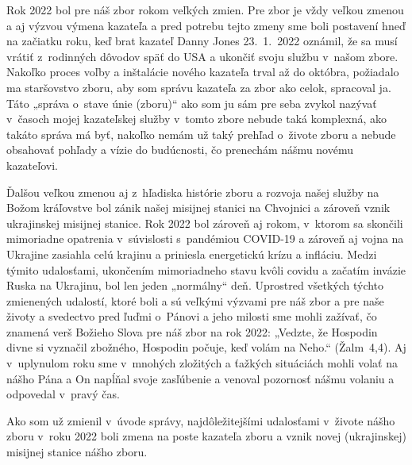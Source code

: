 \def\velkostpisma{9}
\def\velkostriadku{12}



Rok 2022 bol pre náš zbor rokom veľkých zmien. Pre zbor je vždy veľkou zmenou a aj výzvou výmena kazateľa a pred potrebu tejto zmeny sme boli postavení hneď na začiatku roku, keď brat kazateľ Danny Jones 23.~1.~2022 oznámil, že sa musí vrátiť z~rodinných dôvodov späť do USA a ukončiť svoju službu v~našom zbore. Nakoľko proces voľby a inštalácie nového kazateľa trval až do októbra, požiadalo ma staršovstvo zboru, aby som správu kazateľa za zbor ako celok, spracoval ja. Táto „správa o~stave únie (zboru)“ ako som ju sám pre seba zvykol nazývať v~časoch mojej kazateľskej služby v~tomto zbore nebude taká komplexná, ako takáto správa má byť, nakoľko nemám už taký prehľad o~živote zboru a nebude obsahovať pohľady a vízie do budúcnosti, čo prenechám nášmu novému kazateľovi.

Ďalšou veľkou zmenou aj z~hľadiska histórie zboru a rozvoja našej služby na Božom kráľovstve bol zánik našej misijnej stanici na Chvojnici a zároveň vznik ukrajinskej misijnej stanice. Rok 2022 bol zároveň aj rokom, v~ktorom sa skončili mimoriadne opatrenia v~súvislosti s~pandémiou COVID-19 a zároveň aj vojna na Ukrajine zasiahla celú krajinu a priniesla energetickú krízu a infláciu. Medzi týmito udalosťami, ukončením mimoriadneho stavu kvôli covidu a začatím invázie Ruska na Ukrajinu, bol len jeden „normálny“ deň. Uprostred všetkých týchto zmienených udalostí, ktoré boli a sú veľkými výzvami pre náš zbor a pre naše životy a svedectvo pred ľuďmi o~Pánovi a jeho milosti sme mohli zažívať, čo znamená verš Božieho Slova pre náš zbor na rok 2022: „Vedzte, že Hospodin divne si vyznačil zbožného, Hospodin počuje, keď volám na Neho.“ (Žalm~4,4). Aj v~uplynulom roku sme v~mnohých zložitých a ťažkých situáciách mohli volať na nášho Pána a On napĺňal svoje zasľúbenie a venoval pozornosť nášmu volaniu a odpovedal v~pravý čas.


Ako som už zmienil v~úvode správy, najdôležitejšími udalosťami v~živote nášho zboru v~roku 2022 boli zmena na poste kazateľa zboru a vznik novej (ukrajinskej) misijnej stanice nášho zboru.

